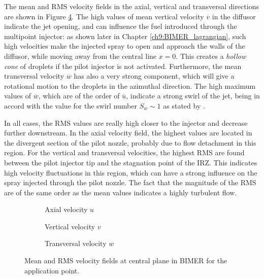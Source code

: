 The mean and RMS velocity fields in the axial, vertical and transversal directions are shown in Figure \ref{fig:field_application}. The high values of mean vertical velocity $\overline{v}$ in the diffusor indicate the jet opening, and can influence the fuel introduced through the multipoint injector: as shown later in Chapter \ref{ch9:BIMER_lagrangian}, such high velocities make the injected spray to open and approach the walls of the diffusor, while moving away from the central line $x = 0$. This creates a \textsl{hollow cone} of droplets if the pilot injector is not activated. Furthermore, the mean transversal velocity $\overline{w}$ has also a very strong component, which will give a rotational motion to the droplets in the azimuthal direction. The high maximum values of $\overline{w}$, which are of the order of $\overline{u}$, indicate a strong swirl of the jet, being in accord with the value for the swirl number $S_w \sim 1$ as stated by .

In all cases, the RMS values are really high closer to the injector and decrease further downstream. In the axial velocity field, the highest values are located in the divergent section of the pilot nozzle, probably due to flow detachment in this region.  For the vertical and transversal velocities, the highest RMS are found between the pilot injector tip and the stagnation point of the IRZ. This indicates high velocity fluctuations in this region, which can have a strong influence on the spray injected through the pilot nozzle. The fact that the magnitude of the RMS are of the same order as the mean values indicates a highly turbulent flow. 


\clearpage


\begin{figure}[ht]
\centering
\begin{subfigure}[b]{1.0\textwidth}
	\centering
   \caption{Axial velocity $u$}
   \label{fig:field_application_axial_velocity}
\end{subfigure}
\begin{subfigure}[b]{1.0\textwidth}
	\centering
   \caption{Vertical velocity $v$}
   \label{fig:field_application_vertical_velocity}
\end{subfigure}
\begin{subfigure}[b]{1.0\textwidth}
	\centering
   \caption{Transversal velocity $w$}
   \label{fig:field_application_transversal_velocity} 
\end{subfigure}
\caption[Mean and RMS velocity fields at central plane in BIMER for the application point]{Mean and RMS velocity fields at central plane in BIMER for the application point.}
\label{fig:field_application}
\end{figure}

